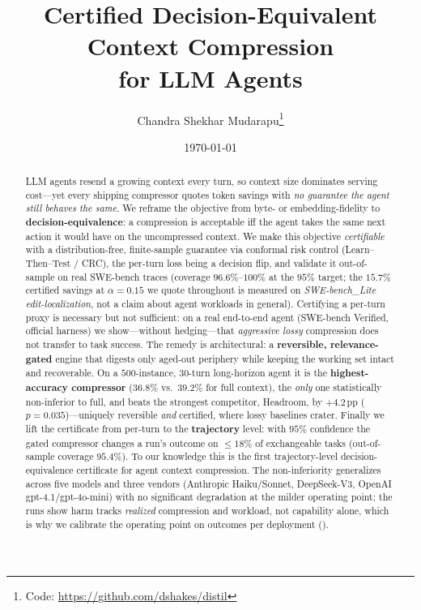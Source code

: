 \documentclass{article}
\title{\textbf{Certified Decision-Equivalent Context Compression\\ for LLM Agents}}
\author{%
  Chandra Shekhar Mudarapu\thanks{Code: \url{https://github.com/dshakes/distil}}
}
\date{\today}
\begin{document}
\maketitle

\begin{abstract}
LLM agents resend a growing context every turn, so context size dominates serving cost---yet
every shipping compressor quotes token savings with \emph{no guarantee the agent still behaves
the same}. We reframe the objective from byte- or embedding-fidelity to
\textbf{decision-equivalence}: a compression is acceptable iff the agent takes the same next
action it would have on the uncompressed context. We make this objective \emph{certifiable}
with a distribution-free, finite-sample guarantee via conformal risk control
(Learn--Then--Test / CRC), the per-turn loss being a decision flip, and validate it
out-of-sample on real SWE-bench traces (coverage $96.6\%$--$100\%$ at the $95\%$ target;
the $15.7\%$ certified savings at $\alpha{=}0.15$ we quote throughout is measured on
\emph{SWE-bench\_Lite edit-localization}, not a claim about agent workloads in general).
Certifying a per-turn proxy is necessary but not sufficient: on a real end-to-end agent
(SWE-bench Verified, official harness) we show---without hedging---that \emph{aggressive lossy}
compression does not transfer to task success. The remedy is architectural: a
\textbf{reversible, relevance-gated} engine that digests only aged-out periphery while keeping
the working set intact and recoverable. On a $500$-instance, $30$-turn long-horizon agent it is
the \textbf{highest-accuracy compressor} ($36.8\%$ vs.\ $39.2\%$ for full context), the
\emph{only} one statistically non-inferior to full, and beats the strongest competitor,
Headroom, by $+4.2$\,pp ($p\!=\!0.035$)---uniquely reversible \emph{and} certified, where lossy
baselines crater. Finally we lift the certificate from per-turn to the \textbf{trajectory}
level: with $95\%$ confidence the gated compressor changes a run's outcome on $\le\!18\%$ of
exchangeable tasks (out-of-sample coverage $95.4\%$). To our knowledge this is the first
trajectory-level decision-equivalence certificate for agent context compression. The
non-inferiority generalizes across five models and three vendors (Anthropic Haiku/Sonnet,
DeepSeek-V3, OpenAI gpt-4.1/gpt-4o-mini) with no significant degradation at the milder operating
point; the runs show harm tracks \emph{realized} compression and workload, not capability alone,
which is why we calibrate the operating point on outcomes per deployment ().
\end{abstract}
\end{document}

